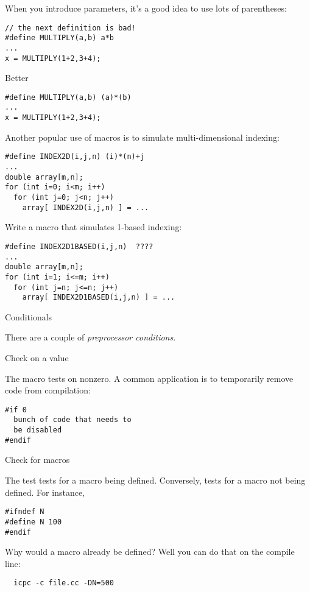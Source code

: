 When you introduce parameters, it's a good idea to use lots of parentheses:
\begin{lstlisting}
// the next definition is bad!
#define MULTIPLY(a,b) a*b
...
x = MULTIPLY(1+2,3+4);
\end{lstlisting}
Better
\begin{lstlisting}
#define MULTIPLY(a,b) (a)*(b)
...
x = MULTIPLY(1+2,3+4);
\end{lstlisting}

Another popular use of macros is to simulate multi-dimensional indexing:
\begin{lstlisting}
#define INDEX2D(i,j,n) (i)*(n)+j
...
double array[m,n];
for (int i=0; i<m; i++)
  for (int j=0; j<n; j++)
    array[ INDEX2D(i,j,n) ] = ...
\end{lstlisting}

\begin{exercise}
  Write a macro that simulates 1-based indexing:
\begin{lstlisting}
#define INDEX2D1BASED(i,j,n)  ????
...
double array[m,n];
for (int i=1; i<=m; i++)
  for (int j=n; j<=n; j++)
    array[ INDEX2D1BASED(i,j,n) ] = ...
\end{lstlisting}
\end{exercise}


 {Conditionals}


There are a couple of \emph{preprocessor conditions}.

 {Check on a value}

The  macro tests on nonzero. A common application is to
temporarily remove code from compilation:
\begin{lstlisting}
#if 0
  bunch of code that needs to
  be disabled
#endif
\end{lstlisting}

 {Check for macros}

The 
test tests for a macro being defined. Conversely,
tests for a macro not being defined. For instance,
\begin{lstlisting}
#ifndef N
#define N 100
#endif
\end{lstlisting}
Why would a macro already be defined? Well you can do that on the
compile line:
\begin{lstlisting}
  icpc -c file.cc -DN=500
\end{lstlisting}

